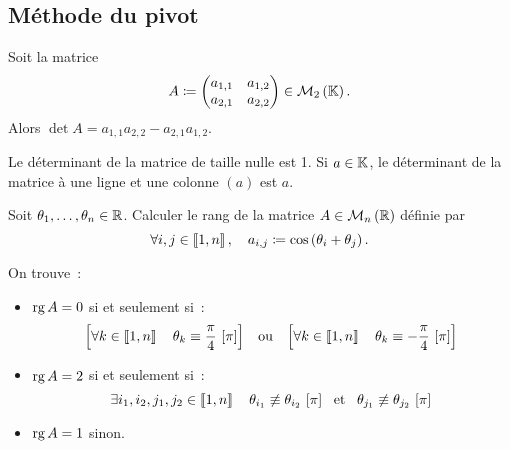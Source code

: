 \documentclass{magnolia}
\begin{document}
\subsection{Méthode du pivot}

\begin{proposition}
Soit la matrice
\[A\coloneqq
  \begin{pmatrix}
  a_{1,1} & a_{1,2}\\
  a_{2,1} & a_{2,2}
  \end{pmatrix}\in\mathcal{M}_{2}\left(\mathbb{K}\right).\]
Alors $\det A=a_{1,1}a_{2,2}-a_{2,1}a_{1,2}$.
\end{proposition}

\begin{remarques}
\remarque Le déterminant de la matrice de taille nulle est 1.
\remarque Si $a \in\mathbb{K}$, le déterminant de la matrice  à une ligne et une colonne $(a)$
  est $a$. 
\end{remarques}
\vspace{2ex}
\begin{exoUnique}
\exo Soit $\theta_1,\ldots,\theta_n\in\mathbb{R}$. Calculer le rang de la matrice
  $A\in\mathcal{M}_{n}\left(\mathbb{R}\right)$ définie par
  \[\forall i,j\in\left\llbracket 1,n\right\rrbracket ,\quad a_{i,j}\coloneqq\cos\left(\theta_i+\theta_j\right).\]   
  \begin{sol}
  On trouve~:
  \begin{itemize}
  \item $\operatorname{rg} A=0$ si et seulement si~:
    \[\left[\forall k\in\left\llbracket 1,n\right\rrbracket \quad \theta_k \equiv \frac{\pi}{4}\ [\pi]\right]
      \quad\!\text{ou}\quad\!
      \left[\forall k\in\left\llbracket 1,n\right\rrbracket \quad \theta_k \equiv -\frac{\pi}{4}\ [\pi]\right]\]
  \item $\operatorname{rg} A=2$ si et seulement si~:
    \[\exists i_1,i_2,j_1,j_2\in\left\llbracket 1,n\right\rrbracket \quad
      \theta_{i_1}\not\equiv \theta_{i_2}\ [\pi] \quad\!\text{et}\quad\!
      \theta_{j_1}\not\equiv \theta_{j_2}\ [\pi]\]
  \item $\operatorname{rg} A=1$ sinon.
  \end{itemize}
  \end{sol}
\end{exoUnique}

\end{document}
